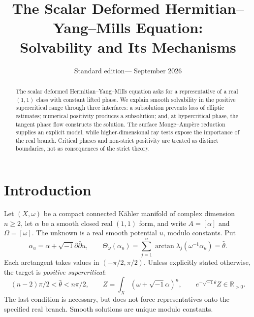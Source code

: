 \documentclass[12pt,reqno]{amsart}
\title[Scalar dHYM: solvability and mechanisms]{The Scalar Deformed Hermitian--Yang--Mills Equation:\\ Solvability and Its Mechanisms}
\author{}
\date{Standard edition\quad---\quad25 September 2026}
\newcommand{\ii}{\sqrt{-1}}
\newcommand{\ddc}{\ii\partial\bar\partial}
\newcommand{\R}{\mathbb R}
\newcommand{\Th}{\Theta_\omega}
\newcommand{\hth}{\widehat\theta}
\begin{document}
\begin{abstract}
The scalar deformed Hermitian--Yang--Mills equation asks for a representative of a real $(1,1)$ class with constant lifted phase. We explain smooth solvability in the positive supercritical range through three interfaces: a subsolution prevents loss of elliptic estimates; numerical positivity produces a subsolution; and, at hypercritical phase, the tangent phase flow constructs the solution. The surface Monge--Amp\`ere reduction supplies an explicit model, while higher-dimensional ray tests expose the importance of the real branch. Critical phases and non-strict positivity are treated as distinct boundaries, not as consequences of the strict theory.
\end{abstract}
\maketitle

\section{Introduction}\label{sec:intro}
Let $(X,\omega)$ be a compact connected K\"ahler manifold of complex dimension $n\geq2$, let $\alpha$ be a smooth closed real $(1,1)$ form, and write $A=[\alpha]$ and $\Omega=[\omega]$. The unknown is a real smooth potential $u$, modulo constants. Put
\begin{equation}\label{eq:equation}
 \alpha_u=\alpha+\ddc u,\qquad
 \Th(\alpha_u)=\sum_{j=1}^n\arctan\lambda_j(\omega^{-1}\alpha_u)=\hth.
\end{equation}
Each arctangent takes values in $(-\pi/2,\pi/2)$. Unless explicitly stated otherwise, the target is \emph{positive supercritical}:
\begin{equation}\label{eq:range}
 (n-2)\pi/2<\hth<n\pi/2,\qquad
 Z=\int_X(\omega+\ii\alpha)^n,\qquad e^{-\ii\hth}Z\in\R_{>0}.
\end{equation}
The last condition is necessary, but does not force representatives onto the specified real branch. Smooth solutions are unique modulo constants.
\end{document}
